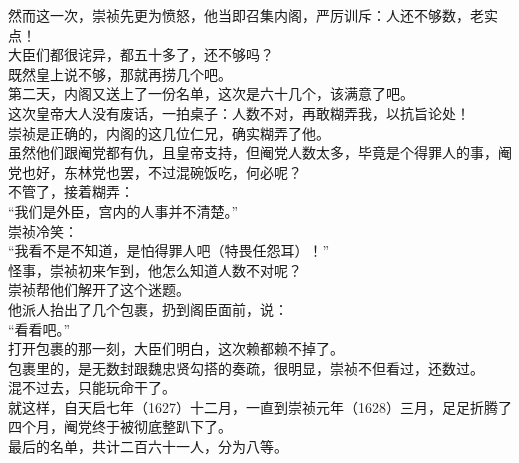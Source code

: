 \begin{multicols}{\theparacolNo}
然而这一次，崇祯先更为愤怒，他当即召集内阁，严厉训斥：人还不够数，老实点！\\

大臣们都很诧异，都五十多了，还不够吗？\\

既然皇上说不够，那就再捞几个吧。\\

第二天，内阁又送上了一份名单，这次是六十几个，该满意了吧。\\

这次皇帝大人没有废话，一拍桌子：人数不对，再敢糊弄我，以抗旨论处！\\

崇祯是正确的，内阁的这几位仁兄，确实糊弄了他。\\

虽然他们跟阉党都有仇，且皇帝支持，但阉党人数太多，毕竟是个得罪人的事，阉党也好，东林党也罢，不过混碗饭吃，何必呢？\\

不管了，接着糊弄：\\

“我们是外臣，宫内的人事并不清楚。”\\

崇祯冷笑：\\

“我看不是不知道，是怕得罪人吧（特畏任怨耳）！”\\

怪事，崇祯初来乍到，他怎么知道人数不对呢？\\

崇祯帮他们解开了这个迷题。\\

他派人抬出了几个包裹，扔到阁臣面前，说：\\

“看看吧。”\\

打开包裹的那一刻，大臣们明白，这次赖都赖不掉了。\\

包裹里的，是无数封跟魏忠贤勾搭的奏疏，很明显，崇祯不但看过，还数过。\\

混不过去，只能玩命干了。\\

就这样，自天启七年（1627）十二月，一直到崇祯元年（1628）三月，足足折腾了四个月，阉党终于被彻底整趴下了。\\

最后的名单，共计二百六十一人，分为八等。\\


\end{multicols}
